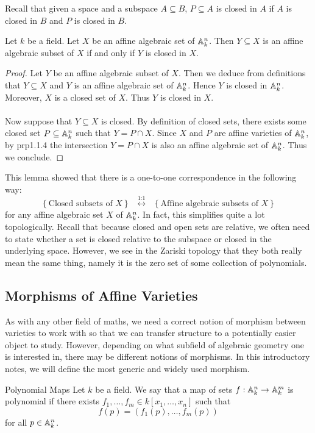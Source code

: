 \documentclass[a4paper]{article}
\begin{document}
Recall that given a space and a subspace $A\subseteq B$, $P\subseteq A$ is closed in $A$ if $A$ is closed in $B$ and $P$ is closed in $B$. 

\begin{lmm}{}{} Let $k$ be a field. Let $X$ be an affine algebraic set of $\mathbb{A}_k^n$. Then $Y\subseteq X$ is an affine algebraic subset of $X$ if and only if $Y$ is closed in $X$. \tcbline
\begin{proof}
Let $Y$ be an affine algebraic subset of $X$. Then we deduce from definitions that $Y\subseteq X$ and $Y$ is an affine algebraic set of $\mathbb{A}_k^n$. Hence $Y$ is closed in $\mathbb{A}_k^n$. Moreover, $X$ is a closed set of $X$. Thus $Y$ is closed in $X$. \\~\\

Now suppose that $Y\subseteq X$ is closed. By definition of closed sets, there exists some closed set $P\subseteq\mathbb{A}_k^n$ such that $Y=P\cap X$. Since $X$ and $P$ are affine varieties of $\mathbb{A}_k^n$, by prp1.1.4 the intersection $Y=P\cap X$ is also an affine algebraic set of $\mathbb{A}_k^n$. Thus we conclude. 
\end{proof}
\end{lmm}

This lemma showed that there is a one-to-one correspondence in the following way: $$\left\{\text{Closed subsets of }X\right\}\;\;\overset{\text{1:1}}{\longleftrightarrow}\;\;\left\{\text{Affine algebraic subsets of }X\right\}$$ for any affine algebraic set $X$ of $\mathbb{A}_k^n$. In fact, this simplifies quite a lot topologically. Recall that because closed and open sets are relative, we often need to state whether a set is closed relative to the subspace or closed in the underlying space. However, we see in the Zariski topology that they both really mean the same thing, namely it is the zero set of some collection of polynomials. 

\subsection{Morphisms of Affine Varieties}
As with any other field of maths, we need a correct notion of morphism between varieties to work with so that we can transfer structure to a potentially easier object to study. However, depending on what subfield of algebraic geometry one is interested in, there may be different notions of morphisms. In this introductory notes, we will define the most generic and widely used morphism. 

\begin{defn}{Polynomial Maps}{} Let $k$ be a field. We say that a map of sets $f:\mathbb{A}_k^n\to\mathbb{A}_k^m$ is polynomial if there exists $f_1,\dots,f_m\in k[x_1,\dots,x_n]$ such that $$f(p)=(f_1(p),\dots,f_m(p))$$ for all $p\in\mathbb{A}_k^n$. 
\end{defn}
\end{document}
